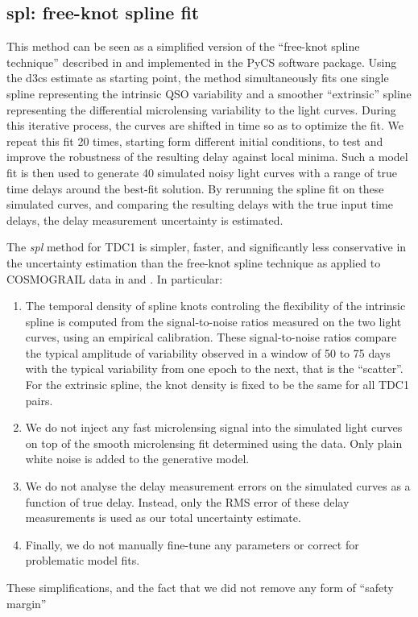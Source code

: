 \documentclass[traditabstract]{aa}
\begin{document}
\subsection{spl: free-knot spline fit}
This method can be seen as a simplified version of the ``free-knot spline technique'' described in \citet{pycs} and implemented in the PyCS software package. Using the d3cs estimate as starting point, the method simultaneously fits one single spline representing the intrinsic QSO variability and a smoother ``extrinsic'' spline representing the differential microlensing variability to the light curves. During this iterative process, the curves are shifted in time so as to optimize the fit. We repeat this fit 20 times, starting form different initial conditions, to test and improve the robustness of the resulting delay against local minima. Such a model fit is then used to generate 40 simulated noisy light curves with a range of true time delays around the best-fit solution. By rerunning the spline fit on these simulated curves, and comparing the resulting delays with the true input time delays, the delay measurement uncertainty is estimated.

The \emph{spl} method for TDC1 is simpler, faster, and significantly less conservative in the uncertainty estimation than the free-knot spline technique as applied to COSMOGRAIL data in \citet{Tewes:2013iz} and \citet{RathnaKumar:2013eu}. In particular:
\begin{enumerate}
\item The temporal density of spline knots controling the flexibility of the intrinsic spline is computed from the signal-to-noise ratios measured on the two light curves, using an empirical calibration. These signal-to-noise ratios compare the typical amplitude of variability observed in a window of 50 to 75 days with the typical variability from one epoch to the next, that is the ``scatter''. For the extrinsic spline, the knot density is fixed to be the same for all TDC1 pairs.
\item We do not inject any fast microlensing signal into the simulated light curves on top of the smooth microlensing fit determined using the data. Only plain white noise is added to the generative model. 
\item We do not analyse the delay measurement errors on the simulated curves as a function of true delay. Instead, only the RMS error of these delay measurements is used as our total uncertainty estimate. 
\item Finally, we do not manually fine-tune any parameters or correct for problematic model fits. 
\end{enumerate}
These simplifications, and the fact that we did not  remove any form of ``safety margin''
\end{document}

